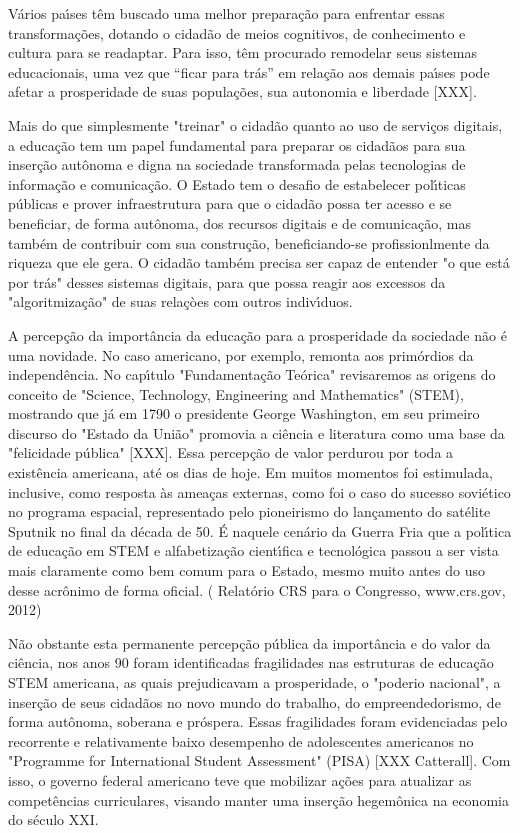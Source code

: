 \documentclass[
12pt,		%
openright,	%
twoside,  %
a4paper,			%
chapter=TITLE,		%
english,			%
french,				%
spanish,			%
brazil				%
]{USPSC-classe/USPSC}
\begin{document}
V\'arios pa\'{\i}ses t\^em buscado uma melhor prepara\c{c}\~ao para enfrentar essas transforma\c{c}\~oes, dotando o cidad\~ao de meios cognitivos, de conhecimento e cultura para se readaptar. Para isso, t\^em procurado remodelar seus sistemas educacionais, uma vez que “ficar para tr\'as” em rela\c{c}\~ao aos demais pa\'{\i}ses pode afetar a prosperidade de suas popula\c{c}\~oes, sua autonomia e liberdade [XXX].


Mais do que simplesmente "treinar" o cidad\~ao quanto ao uso  de servi\c{c}os digitais, a educa\c{c}\~ao tem um papel fundamental para preparar os cidad\~aos para sua inser\c{c}\~ao aut\^onoma e digna na sociedade transformada pelas tecnologias de informa\c{c}\~ao e comunica\c{c}\~ao. O Estado tem o desafio de estabelecer pol\'{\i}ticas p\'ublicas e prover infraestrutura para que o cidad\~ao possa ter acesso e se beneficiar, de forma aut\^onoma, dos recursos digitais e de comunica\c{c}\~ao, mas tamb\'em de contribuir com sua constru\c{c}\~ao, beneficiando-se profissionlmente da riqueza que ele gera. O cidad\~ao tamb\'em precisa ser capaz de entender "o que est\'a por tr\'as" desses sistemas digitais, para que possa reagir aos excessos da "algoritmiza\c{c}\~ao" de suas rela\c{c}òes com outros indiv\'{\i}duos.


A percep\c{c}\~ao da import\^ancia da educa\c{c}\~ao para a prosperidade da sociedade n\~ao \'e uma novidade. No caso americano, por exemplo, remonta aos prim\'ordios da independ\^encia. No cap\'{\i}tulo "Fundamenta\c{c}\~ao Te\'orica" revisaremos as origens do conceito de "Science, Technology, Engineering and Mathematics" (STEM), mostrando que j\'a em 1790 o presidente George Washington, em seu primeiro discurso do "Estado da Uni\~ao" promovia a ci\^encia e literatura como uma base da "felicidade p\'ublica" [XXX]. Essa percep\c{c}\~ao de valor perdurou por toda a exist\^encia americana, at\'e os dias de hoje. Em muitos momentos foi estimulada, inclusive, como resposta \`as amea\c{c}as externas, como foi o caso do sucesso sovi\'etico no programa espacial, representado pelo pioneirismo do lan\c{c}amento do sat\'elite Sputnik no final da d\'ecada de 50. \'E naquele cen\'ario da Guerra Fria que a pol\'{\i}tica de educa\c{c}\~ao em STEM e alfabetiza\c{c}\~ao cient\'{\i}fica e tecnol\'ogica passou a ser vista mais claramente como bem comum para o Estado, mesmo muito antes do uso desse acr\^onimo de forma oficial. ( Relat\'orio CRS para o Congresso, www.crs.gov, 2012)


N\~ao obstante esta permanente percep\c{c}\~ao p\'ublica da import\^ancia e do valor da ci\^encia, nos anos 90 foram identificadas fragilidades nas estruturas de educa\c{c}\~ao STEM americana, as quais prejudicavam a prosperidade, o "poderio nacional", a inser\c{c}\~ao de seus cidad\~aos no novo mundo do trabalho, do empreendedorismo, de forma aut\^onoma, soberana  e pr\'ospera. Essas fragilidades foram evidenciadas pelo recorrente e relativamente baixo desempenho de adolescentes americanos no "Programme for International Student Assessment" (PISA) [XXX Catterall]. Com isso, o governo federal americano teve que mobilizar a\c{c}\~oes para atualizar as compet\^encias curriculares, visando manter uma inser\c{c}\~ao hegem\^onica na economia do s\'eculo XXI.
\end{document}
